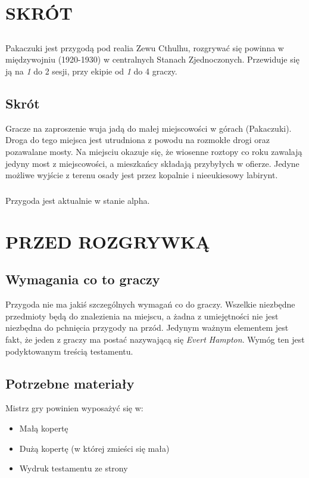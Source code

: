 \documentclass[ms,a4paper]{memoir}
\newcommand{\red}[1]{\textcolor{red!50!black}{#1}}
\newcommand{\RED}[1]{\textcolor{red!50!black}{\MakeUppercase{#1}}}
\begin{document}
\chapter{\RED{Skrót}}
\section{}
\paragraph{}
Pakaczuki jest przygodą pod realia Zewu Cthulhu, rozgrywać się powinna w międzywojniu (1920-1930)
w centralnych Stanach Zjednoczonych. Przewiduje się ją na \emph{1} do 2 sesji, przy ekipie od \emph{1} do 4 graczy.\\
\section{Skrót}
Gracze na zaproszenie wuja jadą do małej miejscowości w górach (Pakaczuki).
Droga do tego miejsca jest utrudniona z powodu na rozmokłe drogi oraz pozawalane mosty.
Na miejsciu okazuje się, że wiosenne roztopy co roku zawalają jedyny most z miejscowości, a mieszkańcy składają przybyłych w ofierze.
Jedyne możliwe wyjście z terenu osady jest przez kopalnie i nieeukiesowy labirynt.
\paragraph{}
Przygoda jest aktualnie w stanie \red{alpha}.
\newpage
\tableofcontents
\newpage

\chapter{\RED{Przed rozgrywką}}

\section{Wymagania co to graczy}
Przygoda nie ma jakiś szczególnych wymagań co do graczy.
Wszelkie niezbędne przedmioty będą do znalezienia na miejscu,
a żadna z umiejętności nie jest niezbędna do pchnięcia przygody
na przód. Jedynym ważnym elementem jest fakt, że jeden z graczy
ma postać nazywającą się \emph{Evert Hampton}. Wymóg ten jest
podyktowanym treścią testamentu.
\section{Potrzebne materiały}
Mistrz gry powinien wyposażyć się w:
\begin{itemize}
\item Małą kopertę
\item Dużą kopertę (w której zmieści się mała)
\item Wydruk testamentu ze strony %
\end{itemize}
\end{document}
